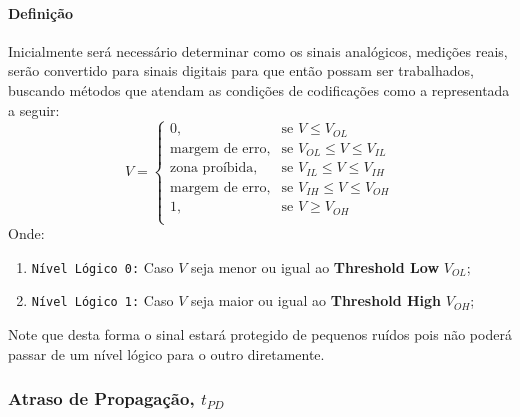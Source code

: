 \documentclass{article}
\begin{document}
                \paragraph{Definição}Inicialmente será necessário determinar como os sinais analógicos, medições reais, serão convertido para sinais digitais para que então possam ser trabalhados, buscando métodos que atendam as condições de codificações como a representada a seguir:
                    \begin{equation}
                        \boxed{
                            V = 
                            \begin{cases}
                                0,                      & \text{se } V \leq V_{OL}\\
                                \text{margem de erro},  & \text{se } V_{OL} \leq V \leq V_{IL}\\
                                \text{zona proíbida},   & \text{se } V_{IL} \leq V \leq V_{IH}\\
                                \text{margem de erro},  & \text{se } V_{IH} \leq V \leq V_{OH}\\
                                1,                      & \text{se } V \geq V_{OH}\\
                            \end{cases}
                        }
                    \end{equation}
                Onde:
                    \begin{enumerate}[noitemsep]
                        \item \texttt{Nível Lógico 0:} Caso $V$ seja menor ou igual ao \textbf{Threshold Low} $V_{OL}$;

                        \item \texttt{Nível Lógico 1:} Caso $V$ seja maior ou igual ao \textbf{Threshold High} $V_{OH}$;
                    \end{enumerate}
                Note que desta forma o sinal estará protegido de pequenos ruídos pois não poderá passar de um nível lógico para o outro diretamente.

        \subsubsection{Atraso de Propagação, $t_{PD}$}
\end{document}
